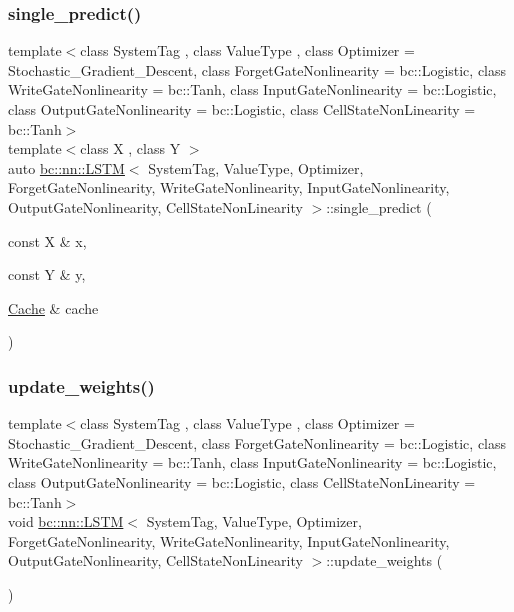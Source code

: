 \subsubsection{\texorpdfstring{single\+\_\+predict()}{single\_predict()}}
{\footnotesize\ttfamily template$<$class System\+Tag , class Value\+Type , class Optimizer  = Stochastic\+\_\+\+Gradient\+\_\+\+Descent, class Forget\+Gate\+Nonlinearity  = bc\+::\+Logistic, class Write\+Gate\+Nonlinearity  = bc\+::\+Tanh, class Input\+Gate\+Nonlinearity  = bc\+::\+Logistic, class Output\+Gate\+Nonlinearity  = bc\+::\+Logistic, class Cell\+State\+Non\+Linearity  = bc\+::\+Tanh$>$ \\
template$<$class X , class Y $>$ \\
auto \hyperlink{structbc_1_1nn_1_1LSTM}{bc\+::nn\+::\+L\+S\+TM}$<$ System\+Tag, Value\+Type, Optimizer, Forget\+Gate\+Nonlinearity, Write\+Gate\+Nonlinearity, Input\+Gate\+Nonlinearity, Output\+Gate\+Nonlinearity, Cell\+State\+Non\+Linearity $>$\+::single\+\_\+predict (\begin{DoxyParamCaption}\item[{const X \&}]{x,  }\item[{const Y \&}]{y,  }\item[{\hyperlink{structbc_1_1nn_1_1Cache}{Cache} \&}]{cache }\end{DoxyParamCaption})\hspace{0.3cm}{\ttfamily [inline]}}

\mbox{\label{structbc_1_1nn_1_1LSTM_a5d295f0329b63593da595a6bbf159959}} 
\subsubsection{\texorpdfstring{update\+\_\+weights()}{update\_weights()}}
{\footnotesize\ttfamily template$<$class System\+Tag , class Value\+Type , class Optimizer  = Stochastic\+\_\+\+Gradient\+\_\+\+Descent, class Forget\+Gate\+Nonlinearity  = bc\+::\+Logistic, class Write\+Gate\+Nonlinearity  = bc\+::\+Tanh, class Input\+Gate\+Nonlinearity  = bc\+::\+Logistic, class Output\+Gate\+Nonlinearity  = bc\+::\+Logistic, class Cell\+State\+Non\+Linearity  = bc\+::\+Tanh$>$ \\
void \hyperlink{structbc_1_1nn_1_1LSTM}{bc\+::nn\+::\+L\+S\+TM}$<$ System\+Tag, Value\+Type, Optimizer, Forget\+Gate\+Nonlinearity, Write\+Gate\+Nonlinearity, Input\+Gate\+Nonlinearity, Output\+Gate\+Nonlinearity, Cell\+State\+Non\+Linearity $>$\+::update\+\_\+weights (\begin{DoxyParamCaption}{ }\end{DoxyParamCaption})\hspace{0.3cm}{\ttfamily [inline]}}

